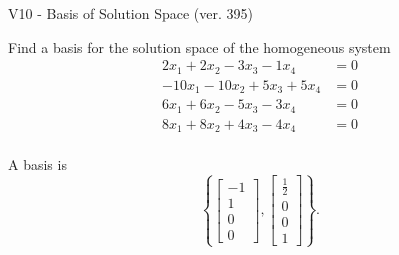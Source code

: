 \begin{exercise}
  \begin{exerciseTitle}V10 - Basis of Solution Space (ver. 395)\end{exerciseTitle}
  \begin{exerciseStatement}
    Find a basis for the solution space of the homogeneous system 
\begin{align*}
 2 x_ 1 + 2 x_ 2 -3 x_ 3 -1 x_ 4 &= 0  \\ 
  -10 x_ 1 -10 x_ 2 + 5 x_ 3 + 5 x_ 4 &= 0  \\ 
  6 x_ 1 + 6 x_ 2 -5 x_ 3 -3 x_ 4 &= 0  \\ 
  8 x_ 1 + 8 x_ 2 + 4 x_ 3 -4 x_ 4 &= 0  \\ 
 \end{align*}


 
  \end{exerciseStatement}

  \begin{exerciseAnswer}
   A basis is   
\[\left\{\left[\begin{array}{c}
-1 \\
1 \\
0 \\
0
\end{array}\right] , \left[\begin{array}{c}
\frac{1}{2} \\
0 \\
0 \\
1
\end{array}\right]\right\}.\]

  


  \end{exerciseAnswer}
\end{exercise}
